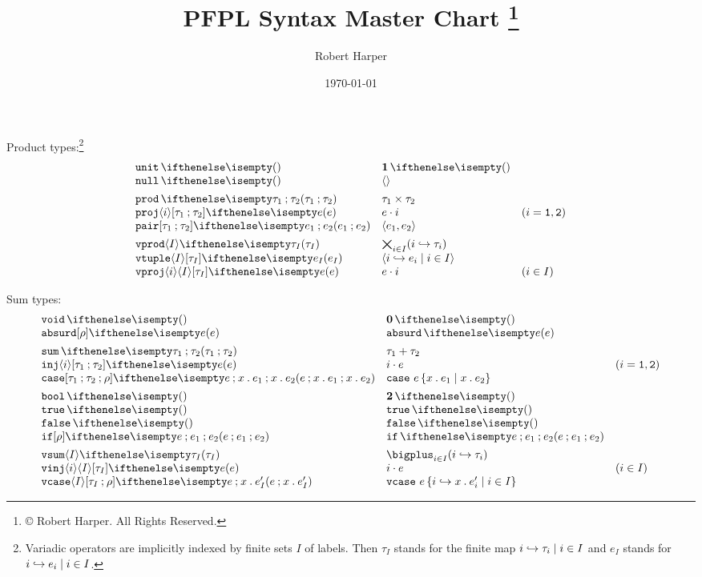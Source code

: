 \documentclass[11pt,twoside]{article}
\title{\textsf{PFPL} Syntax Master Chart%
\footnote{\copyright{} \the\year{} Robert Harper.  All Rights Reserved.}}
\author{Robert Harper}
\date{\today}
\begin{document}
\maketitle{}

\noindent Product types:\footnote{Variadic operators are implicitly indexed by finite sets $I$ of labels.  Then $\tau_I$ stands for the finite map $\finmap{I}{i}{\tau}$ and $e_I$ stands for $\finmap{I}{i}{e}$.}
\begin{displaymath}
  \begin{array}{l@{\quad}l@{\quad}l}
    \unitTy{} & \unitTy*{} \\
    \unitEx{} & \unitEx*{} \\[1ex]

    \prodTy{\tau_1}{\tau_2} & \prodTy*{\tau_1}{\tau_2} \\
    \projEx<i>{e} & \projEx*<i>{e} & (i=\kw{1},\kw{2}) \\
    \pairEx{e_1}{e_2} & \pairEx*{e_1}{e_2} \\[1ex]

    \vprodTy<I><i>{\tau} & \vprodTy*{\tau} \\
    \vtupleEx<I>[\tau]{e} & \vtupleEx*<I>{e} \\
    \vprojEx<I><i>[\tau]{e} & \vprojEx*<i>{e} & (i\in I)
  \end{array}
\end{displaymath}

\noindent Sum types:
\begin{displaymath}
  \begin{array}{l@{\quad}l@{\quad}l}
    \voidTy & \voidTy* \\
    \absurdEx[\rho]{e} & \absurdEx*{e} \\[1ex]

    \sumTy{\tau_1}{\tau_2} & \sumTy*{\tau_1}{\tau_2} \\
    \injEx<i>[\tau_1][\tau_2]{e} & \injEx*<i>{e} & (i=\kw{1},\kw{2}) \\
    \caseEx[\tau][\rho]{e}{x}{e} & \caseEx*{e}{x}{e} \\[1ex]

    \boolTy & \boolTy* \\
    \trueEx & \trueEx* \\
    \falseEx & \falseEx* \\
    \ifEx{e}{e_1}{e_2} & \ifEx*{e}{e_1}{e_2} \\[1ex]

    \vsumTy<I><i>{\tau}  & \vsumTy*<I><i>{\tau} \\
    \vinjEx<I><i>[\tau]{e} & \vinjEx*<I><i>{e} & (i\in I) \\
    \vcaseEx<I>[\rho][\tau]{e}{x}{e'}  & \vcaseEx*<I>{e}{x}{e'}
  \end{array}
\end{displaymath}
\end{document}
